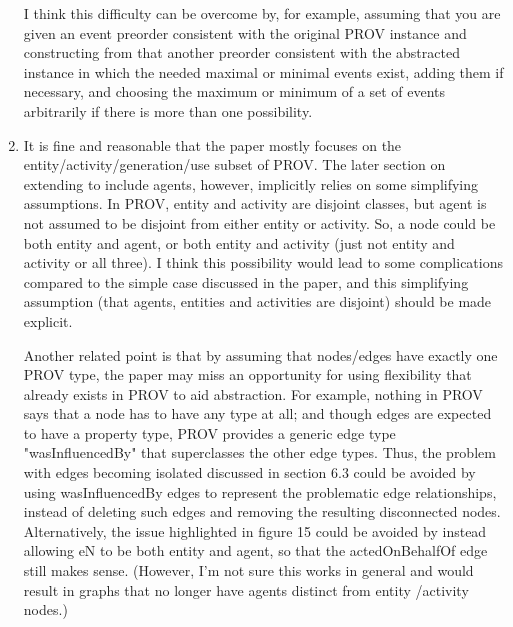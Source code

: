 \documentclass{article}
\newcommand{\showComments}{yes} %
\newcommand{\com}[2]{\ifthenelse{\equal{\showComments}{yes}}{\textcolor{#1}{#2}}{}}
\newcommand{\comment}[1]{\com{red}{#1}}
\begin{document}
\begin{enumerate}
\comment{I'm lost here too. PM to deal with.}

I think this difficulty can be overcome by, for example, assuming that you are given an event preorder consistent with the original PROV instance and constructing from that another preorder consistent with the abstracted instance in which the needed maximal or minimal events exist, adding them if necessary, and choosing the maximum or minimum of a set of events arbitrarily if there is more than one possibility.  



\item It is fine and reasonable that the paper mostly focuses on the entity/activity/generation/use subset of PROV.  The later section on extending to include agents, however, implicitly relies on some simplifying assumptions.  In PROV, entity and activity are disjoint classes, but agent is not assumed to be disjoint from either entity or activity.  So, a node could be both entity and agent, or both entity and activity (just not entity and activity or all three).  I think this possibility would lead to some complications compared to the simple case discussed in the paper, and this simplifying assumption (that agents, entities and activities are disjoint) should be made explicit.

\comment{Yes, it certainly would! And we do make the implicit assumption that agents are disjoint from entities and activities. Soln: just say so somewhere. JWB to do.}
  
Another related point is that by assuming that nodes/edges have exactly one PROV type, the paper may miss an opportunity for using flexibility that already exists in PROV to aid abstraction.  For example, nothing in PROV says that a node has to have any type at all; and though edges are expected to have a property type, PROV provides a generic edge type "wasInfluencedBy" that superclasses the other edge types.  Thus, the problem with edges becoming isolated discussed in section 6.3 could be avoided by using wasInfluencedBy edges to represent the problematic edge relationships, instead of deleting such edges and removing the resulting disconnected nodes.  Alternatively, the issue highlighted in figure 15 could be avoided by instead allowing eN to be both entity and agent, so that the actedOnBehalfOf edge still makes sense.  (However, I'm not sure this works in general and would result in graphs that no longer have agents distinct from entity /activity nodes.)

\comment{Best just say this isn't a direction we go in. Just say that graphs are bi-partite. JWB to do. } 


\end{enumerate}
\end{document}
